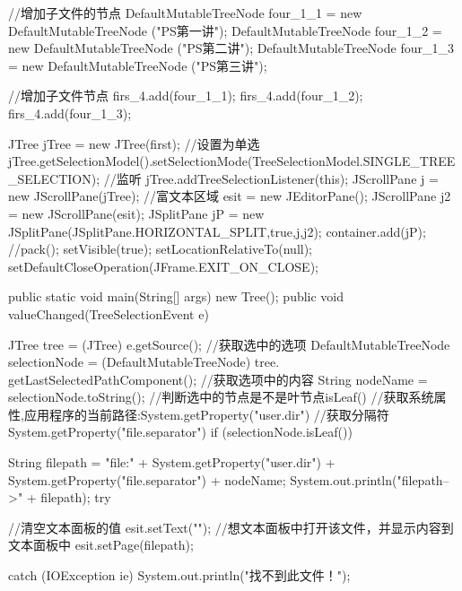 {{		//增加子文件的节点
		DefaultMutableTreeNode  four_1_1 = new DefaultMutableTreeNode ("PS第一讲");
		DefaultMutableTreeNode  four_1_2 = new DefaultMutableTreeNode ("PS第二讲");
		DefaultMutableTreeNode  four_1_3 = new DefaultMutableTreeNode ("PS第三讲");
		
		//增加子文件节点
		firs_4.add(four_1_1);
		firs_4.add(four_1_2);
		firs_4.add(four_1_3);
		
		
		JTree jTree = new JTree(first);
		//设置为单选
		jTree.getSelectionModel().setSelectionMode(TreeSelectionModel.SINGLE_TREE_SELECTION);
		//监听
		jTree.addTreeSelectionListener(this);
		JScrollPane j = new JScrollPane(jTree);
		//富文本区域
		esit = new JEditorPane();
		JScrollPane j2 = new JScrollPane(esit);
		JSplitPane jP = new JSplitPane(JSplitPane.HORIZONTAL_SPLIT,true,j,j2);
		container.add(jP);
		//pack();
		setVisible(true);	
		setLocationRelativeTo(null);
		setDefaultCloseOperation(JFrame.EXIT_ON_CLOSE);
	}
	public static void main(String[] args) {
		new Tree();
	}
	public void valueChanged(TreeSelectionEvent e) {
		JTree tree = (JTree) e.getSource();
        //获取选中的选项
        DefaultMutableTreeNode selectionNode = (DefaultMutableTreeNode) tree.
                                               getLastSelectedPathComponent();
        //获取选项中的内容
        String nodeName = selectionNode.toString();
        //判断选中的节点是不是叶节点isLeaf()
        //获取系统属性,应用程序的当前路径:System.getProperty("user.dir")
        //获取分隔符System.getProperty("file.separator")
        if (selectionNode.isLeaf()) {
            String filepath = "file:" + System.getProperty("user.dir") +
                              System.getProperty("file.separator") + nodeName;
            System.out.println("filepath-->" + filepath);
            try {
            	
				//清空文本面板的值
            	esit.setText("");
            	//想文本面板中打开该文件，并显示内容到文本面板中
            	esit.setPage(filepath);
                
            } catch (IOException ie) {
                System.out.println("找不到此文件！");
            }
        }
	}
}

